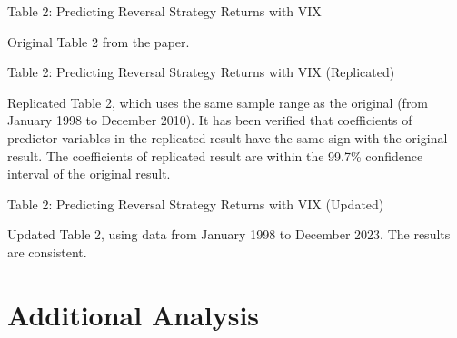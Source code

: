 \documentclass[11pt]{article}
\newcommand*{\PathToOutput}{../output/}
\begin{document}
\begin{landscape}
    \begin{table}[h!]
        \centering
        \caption*{Table 2: Predicting Reversal Strategy Returns with VIX}
        
        \small Original Table 2 from the paper.
        \medskip
        
        \scriptsize
        
    \end{table}
    
    
    \begin{table}[h!]
        \centering
        \caption*{Table 2: Predicting Reversal Strategy Returns with VIX (Replicated)}
    
        \raggedright
        \small Replicated Table 2, which uses the same sample range as the original (from 
        January 1998 to December 2010). 
        It has been verified that coefficients of predictor variables in the replicated result
        have the same sign with the original result. The coefficients of replicated result are
        within the 99.7\% confidence interval of the original result.
        \medskip
        
        \scriptsize
        \centering
        
    \end{table}
    
    \begin{table}[h!]
        \centering
        \caption*{Table 2: Predicting Reversal Strategy Returns with VIX (Updated)}
    
        \small Updated Table 2, using data from January 1998 to December 2023.
        The results are consistent.
        \medskip
        
        \scriptsize
        
    \end{table}
    
    \end{landscape}


\section{Additional Analysis}
\end{document}
